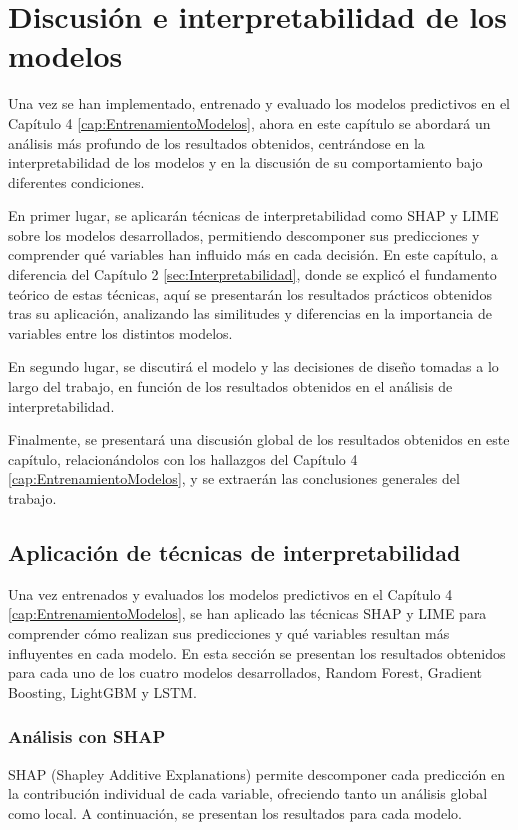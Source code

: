 \chapter{Discusión e interpretabilidad de los modelos}
\label{cap:experimentos}
Una vez se han implementado, entrenado y evaluado los modelos predictivos en el Capítulo 4 \ref{cap:EntrenamientoModelos}, ahora en este capítulo se abordará un análisis más profundo de los resultados obtenidos, centrándose en la interpretabilidad de los modelos y en la discusión de su comportamiento bajo diferentes condiciones.

En primer lugar, se aplicarán técnicas de interpretabilidad como SHAP y LIME sobre los modelos desarrollados, permitiendo descomponer sus predicciones y comprender qué variables han influido más en cada decisión. En este capítulo, a diferencia del Capítulo 2 \ref{sec:Interpretabilidad}, donde se explicó el fundamento teórico de estas técnicas, aquí se presentarán los resultados prácticos obtenidos tras su aplicación, analizando las similitudes y diferencias en la importancia de variables entre los distintos modelos.

En segundo lugar, se discutirá el modelo y las decisiones de diseño tomadas a lo largo del trabajo, en función de los resultados obtenidos en el análisis de interpretabilidad.

Finalmente, se presentará una discusión global de los resultados obtenidos en este capítulo, relacionándolos con los hallazgos del Capítulo 4 \ref{cap:EntrenamientoModelos}, y se extraerán las conclusiones generales del trabajo.

\section{Aplicación de técnicas de interpretabilidad}
Una vez entrenados y evaluados los modelos predictivos en el Capítulo 4 \ref{cap:EntrenamientoModelos}, se han aplicado las técnicas SHAP y LIME para comprender cómo realizan sus predicciones y qué variables resultan más influyentes en cada modelo. En esta sección se presentan los resultados obtenidos para cada uno de los cuatro modelos desarrollados, Random Forest, Gradient Boosting, LightGBM y LSTM.

\subsection{Análisis con SHAP}
SHAP (Shapley Additive Explanations) \cite{xai_shap} permite descomponer cada predicción en la contribución individual de cada variable, ofreciendo tanto un análisis global como local. A continuación, se presentan los resultados para cada modelo.

